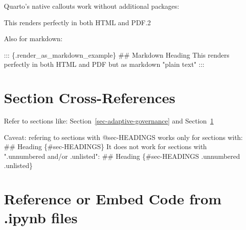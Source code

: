 \documentclass[
  11pt,
  letterpaper,
]{book}
\newenvironment{Shaded}{\begin{snugshade}}{\end{snugshade}}
\newcommand{\AnnotationTok}[1]{\textcolor[rgb]{0.37,0.37,0.37}{#1}}
\newcommand{\CommentTok}[1]{\textcolor[rgb]{0.37,0.37,0.37}{#1}}
\newcommand{\FunctionTok}[1]{\textcolor[rgb]{0.28,0.35,0.67}{#1}}
\newcommand{\NormalTok}[1]{\textcolor[rgb]{0.00,0.23,0.31}{#1}}
\begin{document}
Quarto's native callouts work without additional packages:

\begin{tcolorbox}[enhanced jigsaw, colframe=quarto-callout-note-color-frame, opacityback=0, coltitle=black, opacitybacktitle=0.6, title=\textcolor{quarto-callout-note-color}{\faInfo}\hspace{0.5em}{Important Note2}, bottomtitle=1mm, colbacktitle=quarto-callout-note-color!10!white, titlerule=0mm, colback=white, arc=.35mm, breakable, toptitle=1mm, left=2mm, toprule=.15mm, leftrule=.75mm, bottomrule=.15mm, rightrule=.15mm]

This renders perfectly in both HTML and PDF.2

\end{tcolorbox}

Also for markdown:

\begin{Shaded}
\begin{Highlighting}[]
\NormalTok{::: \{.render\_as\_markdown\_example\}}
\FunctionTok{\#\# Markdown Heading}
\NormalTok{This renders perfectly in both HTML and PDF but as markdown "plain text"}
\NormalTok{:::}
\end{Highlighting}
\end{Shaded}

\section{Section Cross-References}\label{sec-crossref}

Refer to sections like: Section~\ref{sec-adaptive-governance} and
Section~\ref{sec-crossref}

\begin{Shaded}
\begin{Highlighting}[]
\AnnotationTok{Caveat:}\CommentTok{ refering to sections with @sec{-}HEADINGS works only for sections with:}
\FunctionTok{\#\# Heading \{\#sec{-}HEADINGS\}}
\NormalTok{It does not work for sections with ".unnumbered and/or .unlisted":}
\FunctionTok{\#\# Heading \{\#sec{-}HEADINGS .unnumbered .unlisted\}}
\end{Highlighting}
\end{Shaded}

\section{Reference or Embed Code from .ipynb
files}\label{reference-or-embed-code-from-.ipynb-files}
\end{document}
